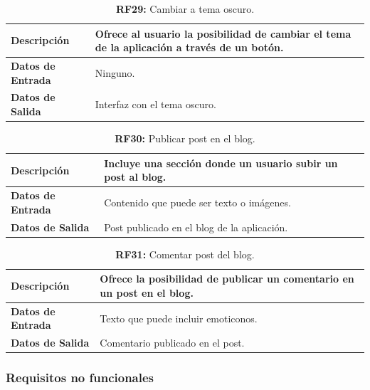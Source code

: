 \documentclass[a4paper, 12pt]{article}
\begin{document}
\begin{table}[H]
\captionsetup{list=no}%
\captionsetup{justification=raggedright,singlelinecheck=false}
\captionsetup{labelformat=empty}
\caption{\textbf{RF29:} Cambiar a tema oscuro.}
\label{tab:RF29}
	\begin{tabular}{|m{5cm}|m{10cm}|}
	\hline
	\textbf{Descripción} & Ofrece al usuario la posibilidad de cambiar el tema de la aplicación a través de un botón. \\ 
	\hline
	\textbf{Datos de Entrada} & Ninguno.\\ 
	\hline
	\textbf{Datos de Salida} & Interfaz con el tema oscuro.  \\ 
	\hline
\end{tabular}
\end{table}

\begin{table}[H]
\captionsetup{list=no}%
\captionsetup{justification=raggedright,singlelinecheck=false}
\captionsetup{labelformat=empty}
\caption{\textbf{RF30:} Publicar post en el blog.}
\label{tab:RF30}
	\begin{tabular}{|m{5cm}|m{10cm}|}
	\hline
	\textbf{Descripción} & Incluye una sección donde un usuario subir un post al blog. \\ 
	\hline
	\textbf{Datos de Entrada} & Contenido que puede ser texto o imágenes. \\ 
	\hline
	\textbf{Datos de Salida} & Post publicado en el blog de la aplicación. \\ 
	\hline
\end{tabular}
\end{table}

\begin{table}[H]
\captionsetup{list=no}%
\captionsetup{justification=raggedright,singlelinecheck=false}
\captionsetup{labelformat=empty}
\caption{\textbf{RF31:} Comentar post del blog.}
\label{tab:RF31}
	\begin{tabular}{|m{5cm}|m{10cm}|}
	\hline
	\textbf{Descripción} & Ofrece la posibilidad de publicar un comentario en un post en el blog. \\ 
	\hline
	\textbf{Datos de Entrada} & Texto que puede incluir emoticonos. \\ 
	\hline
	\textbf{Datos de Salida} & Comentario publicado en el post. \\ 
	\hline
\end{tabular}
\end{table}


\subsubsection{Requisitos no funcionales}
\end{document}
